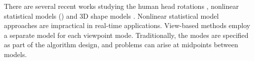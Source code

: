 \documentclass[10pt,twocolumn,letterpaper]{article}
\begin{document}

There are several recent works studying the human head rotations \cite{Cootes2015, Zhu2012}, nonlinear statistical models (\cite{Duong2015BeyondPC}) and 3D shape models \cite{Cao2013, Gu2006}. Nonlinear statistical model approaches are impractical in real-time applications. View-based methods employ a separate model for each viewpoint mode. Traditionally, the modes are specified as part of the algorithm design, and problems can arise at midpoints between models. 


\end{document}
